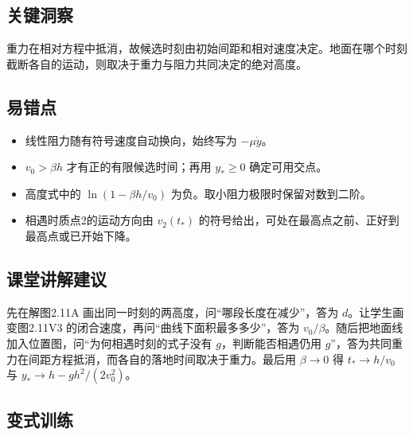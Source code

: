 \documentclass[UTF8,fontset=fandol,a4paper,11pt]{ctexart}
\begin{document}


\subsection*{关键洞察}

重力在相对方程中抵消，故候选时刻由初始间距和相对速度决定。地面在哪个时刻截断各自的运动，则取决于重力与阻力共同决定的绝对高度。



\subsection*{易错点}

\begin{itemize}
\item 线性阻力随有符号速度自动换向，始终写为 $-\mu\dot y$。
\item $v_0>\beta h$ 才有正的有限候选时间；再用 $y_*\geq0$ 确定可用交点。
\item 高度式中的 $\ln(1-\beta h/v_0)$ 为负。取小阻力极限时保留对数到二阶。
\item 相遇时质点2的运动方向由 $v_2(t_*)$ 的符号给出，可处在最高点之前、正好到最高点或已开始下降。
\end{itemize}



\subsection*{课堂讲解建议}

先在解图2.11A 画出同一时刻的两高度，问“哪段长度在减少”，答为 $d$。让学生画变图2.11V3 的闭合速度，再问“曲线下面积最多多少”，答为 $v_0/\beta$。随后把地面线加入位置图，问“为何相遇时刻的式子没有 $g$，判断能否相遇仍用 $g$”，答为共同重力在间距方程抵消，而各自的落地时间取决于重力。最后用 $\beta\to0$ 得 $t_*\to h/v_0$ 与 $y_*\to h-gh^2/(2v_0^2)$。



\subsection*{变式训练}
\end{document}
